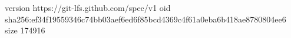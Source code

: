 version https://git-lfs.github.com/spec/v1
oid sha256:ef34f19559346c74bb03aef6ed6f85bcd4369c4f61a0eba6b418ae8780804ee6
size 174916
